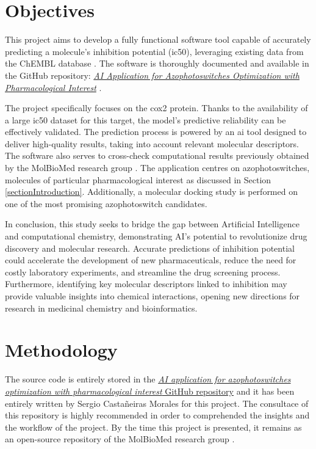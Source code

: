 \documentclass[11pt]{article}
\begin{document}
\newpage
\section{Objectives}

\hspace{0.55cm}This project aims to develop a fully functional software tool capable of accurately predicting a molecule’s inhibition potential (\gls{ic50}), leveraging existing data from the ChEMBL database \cite{ChemblDatabase}. The software is thoroughly documented and available in the GitHub repository: \href{https://github.com/SirSergi0/Repository—AI-application-for-azophotoswitches-optimization-with-pharmacological-interest}{\emph{AI Application for Azophotoswitches Optimization with Pharmacological Interest}} \cite{GitHub}\cite{azophotoswitches2025}.

The project specifically focuses on the \gls{cox2} protein. Thanks to the availability of a large \gls{ic50} dataset for this target, the model’s predictive reliability can be effectively validated. The prediction process is powered by an \gls{ai} tool designed to deliver high-quality results, taking into account relevant molecular descriptors. The software also serves to cross-check computational results previously obtained by the MolBioMed research group \cite{molbiomed}. The application centres on azophotoswitches, molecules of particular pharmacological interest as discussed in Section \ref{sectionIntroduction}. Additionally, a molecular docking study is performed on one of the most promising azophotoswitch candidates.

In conclusion, this study seeks to bridge the gap between Artificial Intelligence and computational chemistry, demonstrating AI’s potential to revolutionize drug discovery and molecular research. Accurate predictions of inhibition potential could accelerate the development of new pharmaceuticals, reduce the need for costly laboratory experiments, and streamline the drug screening process. Furthermore, identifying key molecular descriptors linked to inhibition may provide valuable insights into chemical interactions, opening new directions for research in medicinal chemistry and bioinformatics.

\newpage
\section{Methodology}\label{sectionMethodology}
\hspace{0.55cm}The source code is entirely stored in the \href{https://github.com/SirSergi0/Repository---AI-application-for-azophotoswitches-optimization-with-pharmacological-interest}{\emph{AI application for azophotoswitches optimization with pharmacological interest} GitHub repository}\cite{GitHub} and it has been entirely written by Sergio Castañeiras Morales for this project\cite{azophotoswitches2025}. The consultace of this repository is highly recommended in order to comprehended the insights and the workflow of the project. By the time this project is presented, it remains as an open-source repository of the MolBioMed research group \cite{molbiomed}.
\end{document}
